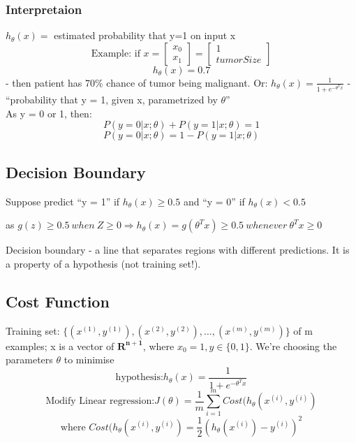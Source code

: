 \documentclass{scrartcl}
\begin{document}
\subsubsection{Interpretaion}
$h_\theta(x) = $ estimated probability that y=1 on input x
\begin{equation*}
  \textrm{Example: if }  x = \left[ \begin{array}{c} x_0 \\
      x_1  \end{array} \right] = \left[ \begin{array}{c} 1 \\
      tumorSize  \end{array} \right]
\end{equation*}
\begin{equation*} h_\theta(x) = 0.7 \end{equation*} - then patient has
70\% chance of tumor being malignant. Or: $ h_\theta(x) = \frac{1}{1 +
  e^{-\theta^Tx}}$ - ``probability that y = 1, given
x, parametrized by $\theta$'' \\
As y = 0 or 1, then:
\[P( y = 0 | x;\theta) + P(y=1|x;\theta) = 1\]
\[P( y = 0 | x;\theta) = 1 - P(y=1|x;\theta)\]

\subsection{Decision Boundary}
Suppose predict ``y = 1'' if $h_\theta(x) \geq 0.5$ 
and ``y = 0'' if $h_\theta(x) < 0.5$ 

as $g(z) \geq 0.5 \ when \ Z \geq 0 \Rightarrow h_\theta(x) =
g(\theta^Tx) \geq 0.5 \ whenever \ \theta^Tx \geq 0$
\label {page 10 from pdf}

Decision boundary - a line that separates regions with different
predictions. It is a property of a hypothesis (not training set!).

\subsection{Cost Function}
\label{sec:6-4}
Training set: $\{(x^{(1)},y^{(1)}), (x^{(2)},y^{(2)}), \dots ,
(x^{(m)},y^{(m)})\}$ of m examples; x is a vector of
$\mathbf{R^{n+1}}$, where $x_0 = 1, y \in \{0, 1\}$. We're choosing
the parameters $\theta$ to minimise
\[ \textrm{hypothesis:} h_\theta(x) = \frac{1}{1 + e^{-\theta^T x}} \]
\[ \textrm{Modify Linear regression:} J(\theta) = \frac{1}{m}
\sum\limits_{i=1}^m Cost (h_\theta(x^{(i)}, y^{(i)}) \]
\[ \textrm{where } Cost (h_\theta(x^{(i)}, y^{(i)}) =
\frac{1}{2}(h_\theta(x^{(i)}) - y^{(i)})^2 \]
\end{document}
